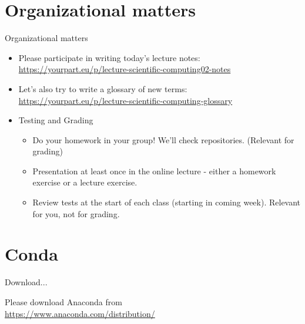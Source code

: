 
\subtitle{Installation of Python using Conda and first steps in Python}
\date{2020-03-26}


\begin{frame}
	\tableofcontents
\end{frame}


\section{Organizational matters}
\begin{frame}[fragile]{Organizational matters}

	\begin{itemize}
		\item Please participate in writing today's lecture notes:
            \href{https://yourpart.eu/p/lecture-scientific-computing02-notes}{https://yourpart.eu/p/lecture-scientific-computing02-notes}\pause
        \item Let's also try to write a glossary of new terms:\\
            \href{https://yourpart.eu/p/lecture-scientific-computing-glossary}{https://yourpart.eu/p/lecture-scientific-computing-glossary}
		\item Testing and Grading
			\begin{itemize}
				\item Do your homework in your group! We'll check repositories. (Relevant for grading)
				\item Presentation at least once in the online lecture - either a homework exercise or a lecture exercise.
				\item Review tests at the start of each class (starting in coming week). Relevant for you, not for grading.
				
			\end{itemize}
	\end{itemize}
\end{frame}

\section{Conda}
\begin{frame}{Download...}

	Please download Anaconda from\\
	\href{https://www.anaconda.com/distribution/}{https://www.anaconda.com/distribution/}\\

\end{frame}

